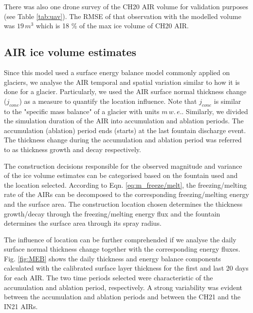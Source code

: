 \documentclass[utf8]{frontiersSCNS}
\begin{document}
There was also one drone survey of the CH20 AIR volume for validation purposes (see Table \ref{tab:uav}). The
RMSE of that observation with the modelled volume was $19\, m^3$ which is 18 \% of the max ice volume of CH20
AIR.

\subsection{AIR ice volume estimates}

Since this model used a surface energy balance model commonly applied on glaciers, we analyse the AIR temporal
and spatial variation similar to how it is done for a glacier. Particularly, we used the AIR surface normal
thickness change ($j_{cone}$) as a measure to quantify the location influence. Note that $j_{cone}$ is similar
to the "specific mass balance" of a glacier with units $m \, w.\, e.$. Similarly, we divided the simulation duration
of the AIR into accumulation and ablation periods. The accumulation (ablation) period ends (starts) at the last
fountain discharge event. The thickness change during the accumulation and ablation period was referred to as
thickness growth and decay respectively.

The construction decisions responsible for the observed magnitude and variance of the ice volume estimates can
be categorised based on the fountain used and the location selected. According to Eqn.  \ref{eq:m_freeze/melt},
the freezing/melting rate of the AIRs can be decomposed to the corresponding freezing/melting energy and the
surface area. The construction location chosen determines the thickness growth/decay through the
freezing/melting energy flux and the fountain determines the surface area through its spray radius.

The influence of location can be further comprehended if we analyse the daily surface normal thickness change
together with the corresponding energy fluxes. Fig. \ref{fig:MEB} shows the daily thickness and energy balance
components calculated with the calibrated surface layer thickness for the first and last 20 days for each AIR. The two time
periods selected were characteristic of the accumulation and ablation period, respectively. A strong variability
was evident between the accumulation and ablation periods and between the CH21 and the IN21 AIRs.
\end{document}
